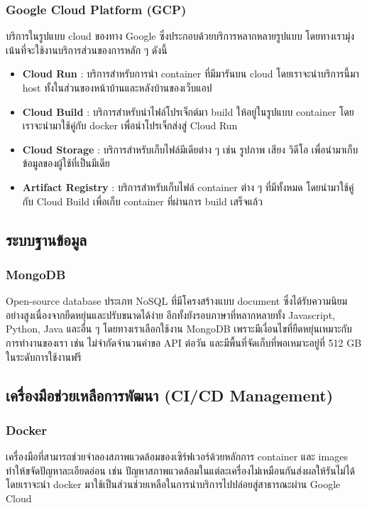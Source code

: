 \subsubsection{Google Cloud Platform (GCP)}
บริการในรูปแบบ cloud ของทาง Google ซึ่งประกอบด้วยบริการหลากหลายรูปแบบ 
โดยทางเรามุ่งเน้นที่จะใช้งานบริการส่วนของการหลัก ๆ ดังนี้
\begin{itemize}
    \item \textbf{Cloud Run} : บริการสำหรับการนำ container ที่มีมารันบน cloud โดยเราจะนำบริการนี้มา host ทั้งในส่วนของหน้าบ้านและหลังบ้านของเว็บแอป
    \item \textbf{Cloud Build} : บริการสำหรับนำไฟล์โปรเจ็กต์มา build ให้อยู่ในรูปแบบ container โดยเราจะนำมาใช้คู่กับ docker เพื่อนำโปรเจ็กส่งสู่ Cloud Run
    \item \textbf{Cloud Storage} : บริการสำหรับเก็บไฟล์มีเดียต่าง ๆ เช่น รูปภาพ เสียง วิดีโอ เพื่อนำมาเก็บข้อมูลของผู้ใช้ที่เป็นมีเดีย
    \item \textbf{Artifact Registry} : บริการสำหรับเก็บไฟล์ container ต่าง ๆ ที่มีทั้งหมด โดยนำมาใช้คู่กับ Cloud Build เพื่อเก็บ container ที่ผ่านการ build เสร็จแล้ว
\end{itemize}

\subsection{ระบบฐานข้อมูล}
\subsubsection{MongoDB}
Open-source database ประเภท NoSQL ที่มีโครงสร้างแบบ document 
ซึ่งได้รับความนิยมอย่างสูงเนื่องจากยืดหยุ่นและปรับขนาดได้ง่าย 
อีกทั้งยังรอบภาษาที่หลากหลายทั้ง Javascript, Python, Java และอื่น ๆ 
โดยทางเราเลือกใช้งาน MongoDB เพราะมีเงื่อนไขที่ยืดหยุ่นเหมาะกับการทำงานของเรา 
เช่น ไม่จำกัดจำนวนคำขอ API ต่อวัน และมีพื้นที่จัดเก็บที่พอเหมาะอยู่ที่ 512 GB 
ในระดับการใช้งานฟรี
\subsection{เครื่องมือช่วยเหลือการพัฒนา (CI/CD Management)}
\subsubsection{Docker}
เครื่องมือที่สามารถช่วยจำลองสภาพแวดล้อมของเซิร์ฟเวอร์ด้วยหลักการ container 
และ images ทำให้ขจัดปัญหาละเอียดอ่อน เช่น ปัญหาสภาพแวดล้อมในแต่ละเครื่องไม่เหมือนกันส่งผลให้รันไม่ได้ โดยเราจะนำ docker มาใช้เป็นส่วนช่วยเหลือในการนำบริการไปปล่อยสู่สาธารณะผ่าน Google Cloud
